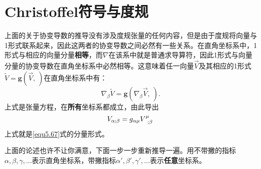 \section{Christoffel符号与度规}
\label{sec5.4}
上面的关于协变导数的推导没有涉及度规张量的任何内容，但是由于度规将向量与1形式联系起来，因此这两者的协变导数之间必然有一些关系。在直角坐标系中，1形式与相应的向量分量\textbf{相等}，而$\nabla$在该系中就是普通求导算符，因此1形式与向量分量的协变导数在直角坐标系中必然相等。这意味着任一向量$\vec{V}$及其相应的1形式$\tilde{V} = \mathbf{g} (\vec{V}, \ )$在直角坐标系中有：
\begin{equation}
    \nabla_\beta \tilde{V} = \mathbf{g} (\nabla_\beta \vec{V}, \ ).
\label{equ5.67}
\end{equation}
上式是张量方程，在\textbf{所有}坐标系都成立，由此导出
\begin{equation}
    V_{\alpha; \beta} = g_{\alpha \mu} V\indices{^\mu_{; \beta}}
\label{equ5.68}
\end{equation}
上式就是\eqref{equ5.67}式的分量形式。

上面的论述也许不让你满意，下面一步一步重新推导一遍。用不带撇的指标$\alpha, \beta, \gamma, \dots$表示直角坐标系，带撇指标$\alpha', \beta', \gamma', \dots$表示\textbf{任意}坐标系。

